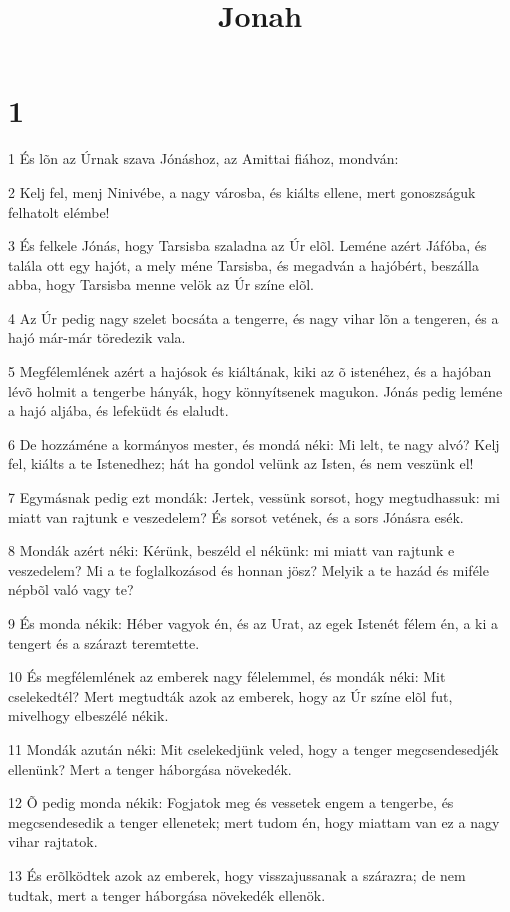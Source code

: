 

\title{Jonah}


\chapter{1}

\par 1 És lõn az Úrnak szava Jónáshoz, az Amittai fiához, mondván:
\par 2 Kelj fel, menj Ninivébe, a nagy városba, és kiálts ellene, mert gonoszságuk felhatolt elémbe!
\par 3 És felkele Jónás, hogy Tarsisba szaladna az Úr elõl. Leméne azért Jáfóba, és talála ott egy hajót, a mely méne Tarsisba, és megadván a hajóbért, beszálla abba, hogy Tarsisba menne velök az Úr színe elõl.
\par 4 Az Úr pedig nagy szelet bocsáta a tengerre, és nagy vihar lõn a tengeren, és a hajó már-már töredezik vala.
\par 5 Megfélemlének azért a hajósok és kiáltának, kiki az õ istenéhez, és a hajóban lévõ holmit a tengerbe hányák, hogy könnyítsenek magukon. Jónás pedig leméne a hajó aljába, és lefeküdt és elaludt.
\par 6 De hozzáméne a kormányos mester, és mondá néki: Mi lelt, te nagy alvó? Kelj fel, kiálts a te Istenedhez; hát ha gondol velünk az Isten, és nem veszünk el!
\par 7 Egymásnak pedig ezt mondák: Jertek, vessünk sorsot, hogy megtudhassuk: mi miatt van rajtunk e veszedelem? És sorsot vetének, és a sors Jónásra esék.
\par 8 Mondák azért néki: Kérünk, beszéld el nékünk: mi miatt van rajtunk e veszedelem? Mi a te foglalkozásod és honnan jösz? Melyik a te hazád és miféle népbõl való vagy te?
\par 9 És monda nékik: Héber vagyok én, és az Urat, az egek Istenét félem én, a ki a tengert és a szárazt teremtette.
\par 10 És megfélemlének az emberek nagy félelemmel, és mondák néki: Mit cselekedtél? Mert megtudták azok az emberek, hogy az Úr színe elõl fut, mivelhogy elbeszélé nékik.
\par 11 Mondák azután néki: Mit cselekedjünk veled, hogy a tenger megcsendesedjék ellenünk? Mert a tenger háborgása növekedék.
\par 12 Õ pedig monda nékik: Fogjatok meg és vessetek engem a tengerbe, és megcsendesedik a tenger ellenetek; mert tudom én, hogy miattam van ez a nagy vihar rajtatok.
\par 13 És erõlködtek azok az emberek, hogy visszajussanak a szárazra; de nem tudtak, mert a tenger háborgása növekedék ellenök.
